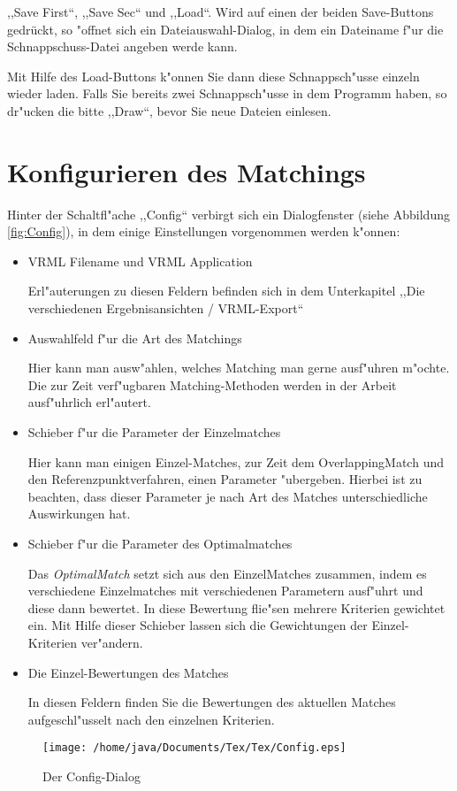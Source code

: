 ,,Save First``, ,,Save Sec`` und ,,Load``. Wird auf einen der beiden Save-Buttons gedrückt, so "offnet sich ein Dateiauswahl-Dialog, in dem ein Dateiname f"ur die Schnappschuss-Datei angeben werde kann.

Mit Hilfe des Load-Buttons k"onnen Sie dann diese Schnappsch"usse einzeln wieder laden. Falls Sie bereits zwei Schnappsch"usse in dem Programm haben, so dr"ucken die bitte ,,Draw``, bevor Sie neue Dateien einlesen.
\section{Konfigurieren des Matchings}
Hinter der Schaltfl"ache ,,Config`` verbirgt sich ein Dialogfenster (siehe Abbildung \vref{fig:Config}), in dem einige Einstellungen vorgenommen werden k"onnen:

\begin{itemize}
\item VRML Filename und VRML Application

Erl"auterungen zu diesen Feldern befinden sich in dem Unterkapitel ,,Die verschiedenen Ergebnisansichten / VRML-Export``

\item Auswahlfeld f"ur die Art des Matchings

Hier kann man ausw"ahlen, welches Matching man gerne ausf"uhren m"ochte. Die zur Zeit verf"ugbaren Matching-Methoden werden in der Arbeit ausf"uhrlich erl"autert.

\item Schieber f"ur die Parameter der Einzelmatches

Hier kann man einigen Einzel-Matches, zur Zeit dem OverlappingMatch und den Referenzpunktverfahren, einen Parameter "ubergeben. Hierbei ist zu beachten, dass dieser Parameter je nach Art des Matches unterschiedliche Auswirkungen hat.

\item Schieber f"ur die Parameter des Optimalmatches

Das \textit{OptimalMatch} setzt sich aus den EinzelMatches zusammen, indem es verschiedene Einzelmatches mit verschiedenen Parametern ausf"uhrt und diese dann bewertet. In diese Bewertung flie"sen mehrere Kriterien gewichtet ein. Mit Hilfe dieser Schieber lassen sich die Gewichtungen der Einzel-Kriterien ver"andern.

\item Die Einzel-Bewertungen des Matches

In diesen Feldern finden Sie die Bewertungen des aktuellen Matches aufgeschl"usselt nach den einzelnen Kriterien.
\end{itemize} 
\begin{figure}
   \centering
   \texttt{[image: /home/java/Documents/Tex/Tex/Config.eps]}
   \caption{Der Config-Dialog}
   \label{fig:Config}
\end{figure}
